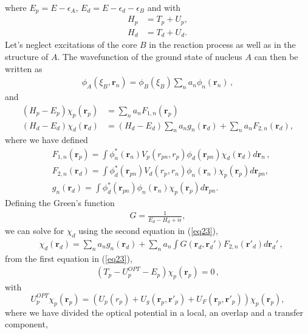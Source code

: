 \documentclass[a4paper,11pt]{article}
\begin{document}
where $E_p=E-\epsilon_A$, $E_d=E-\epsilon_d-\epsilon_B$ and
with
\begin{align}\label{eq21}
\nonumber H_p&=T_p+U_p,\\
H_d&=T_d+U_d.
\end{align}
Let's neglect excitations of the core $B$ in the reaction process as well as in the structure of $A$. The wavefunction of the ground state of nucleus $A$ can then be written as
\begin{align}
\nonumber \phi_A(\xi_B,\mathbf r_n)=\phi_B(\xi_B)\sum_n a_n\phi_n(\mathbf r_n)\,,
\end{align}
and
\begin{align}\label{eq23}
\nonumber (H_p-E_p)\chi_p(\mathbf r_p)&=\sum_n a_n F_{1,n}(\mathbf r_p)\\
(H_d-E_d)\chi_d(\mathbf r_d)&=(H_d-E_d)\sum_n a_n g_n(\mathbf r_d)+\sum_n a_n F_{2,n}(\mathbf r_d),
\end{align}
where we have defined
\begin{align}\label{eq22}
\nonumber&F_{1,n}(\mathbf r_p)=\int \phi_n^*(\mathbf r_n)V_p(r_{pn},r_p)\phi_d(\mathbf r_{pn})\chi_d(\mathbf r_d)d\mathbf r_n\,,\\
 \nonumber&F_{2,n}(\mathbf r_d)= \int \phi_d^*(\mathbf r_{pn})V_d(r_{p},r_n)\phi_n(\mathbf r_n)\chi_p(\mathbf r_p)d\mathbf r_{pn},\\
  & g_n(\mathbf r_d)=\int \phi_d^*(\mathbf r_{pn})\phi_n(\mathbf r_{n})\chi_p(\mathbf r_p)d\mathbf r_{pn}.
\end{align}
Defining the Green's function
\begin{align}\label{eq30}
G=\frac{1}{E_d-H_d+i\epsilon},
\end{align}
we can solve for $\chi_d$ using the second equation in (\ref{eq23}),
\begin{align}\label{eq24}
&\chi_d(\mathbf r_d)=\sum_n a_n g_n(\mathbf r_d)+\sum_n a_n\int G(\mathbf r_d,\mathbf r_d')F_{2,n}(\mathbf r'_d)d\mathbf r_d'\,,
\end{align}
from the first equation in (\ref{eq23}),
\begin{align}\label{eq26}
\left(T_p-U_p^{OPT}-E_p\right)\chi_p(\mathbf r_p)=0\,,
\end{align}
with
\begin{equation}\label{eq27}
\nonumber U_{p}^{OPT}\chi_p(\mathbf r_p)=\left(U_p(r_p)+U_g(\mathbf r_p,\mathbf r'_p)+U_F(\mathbf r_p,\mathbf r'_p)\right)\chi_p(\mathbf r_p),
\end{equation}
where we have divided the optical potential in a local, an overlap and a transfer component,
\end{document}

